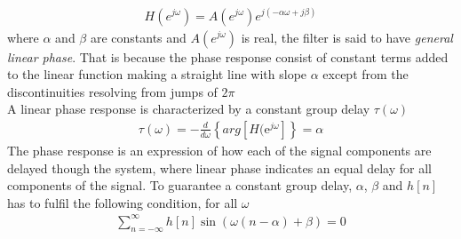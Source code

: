 \begin{align}\label{eq:lin_pha}
H(e^{j\omega})=A(e^{j\omega})e^{j(-\alpha\omega + j\beta)} 
\end{align}
where $\alpha$ and $\beta$ are constants and $A(e^{j\omega})$ is real, the filter is said to have \textit{general linear phase}. That is because the phase response consist of constant terms added to the linear function making a straight line with slope $\alpha$ except from the discontinuities resolving from jumps of $2\pi$ \\
A linear phase response is characterized by a constant group delay $\tau(\omega)$
\begin{align}
\tau(\omega)=-\frac{d}{d\omega}\left\{ arg \left[ H(\text{e}^{j\omega}\right] \right\} = \alpha
\end{align}
The phase response is an expression of how each of the signal components are delayed though the system, where linear phase indicates an equal delay for all components of the signal. To guarantee a constant group delay, $\alpha$, $\beta$ and $h[n]$ has to fulfil the following condition, for all $\omega$
\begin{align}\label{eq:cons_gro}
\sum_{n=-\infty}^{\infty}h[n]\sin\left(\omega \left(n-\alpha \right) + \beta \right) = 0
\end{align}


